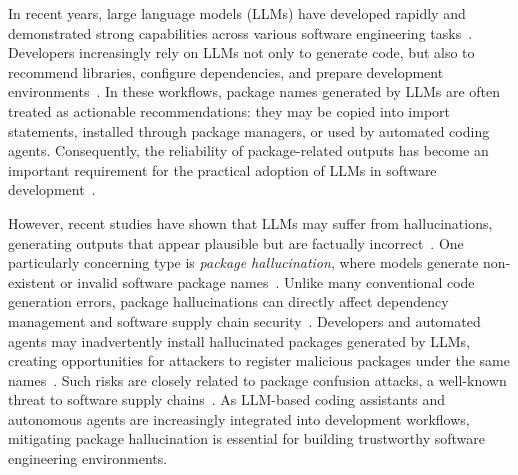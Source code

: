 In recent years, large language models (LLMs) have developed rapidly and demonstrated strong capabilities across various software engineering tasks~\cite{wang2023review,jimenez2024swe,roziere2023code,sun2025source}. Developers increasingly rely on LLMs not only to generate code, but also to recommend libraries, configure dependencies, and prepare development environments~\cite{alhanahnah2024depsrag,latendresse2025robust}. In these workflows, package names generated by LLMs are often treated as actionable recommendations: they may be copied into import statements, installed through package managers, or used by automated coding agents. Consequently, the reliability of package-related outputs has become an important requirement for the practical adoption of LLMs in software development~\cite{pearce2025asleep,perry2023users}.



However, recent studies have shown that LLMs may suffer from hallucinations, generating outputs that appear plausible but are factually incorrect~\cite{zhang2025siren,gao2025current,zhang2025llm}.
One particularly concerning type is \emph{package hallucination}, where models generate non-existent or invalid software package names~\cite{spracklen2025we,krishna2025importing,zhao2025hfuzzer}. Unlike many conventional code generation errors, package hallucinations can directly affect dependency management and software supply chain security~\cite{ohm2020backstabber,ladisa2023sok,neupane2023beyond}. Developers and automated agents may inadvertently install hallucinated packages generated by LLMs, creating opportunities for attackers to register malicious packages under the same names~\cite{spracklen2025we}. Such risks are closely related to package confusion attacks, a well-known threat to software supply chains~\cite{lanyado2024diving,kaplan2021survey}. As LLM-based coding assistants and autonomous agents are increasingly integrated into development workflows, mitigating package hallucination is essential for building trustworthy software engineering environments.

